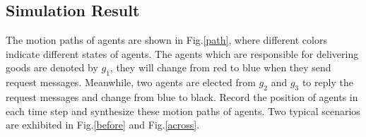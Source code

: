 \documentclass[journal]{IEEEtran}
\begin{document}
\subsection{Simulation Result}
The motion paths of agents are shown in Fig.\ref{path}, where different colors indicate different states of agents. The agents which are responsible for delivering  goods are denoted by $g_1$, they will change from red to blue when they send request messages. Meanwhile, two agents are elected from $g_2$ and $g_3$ to reply the request messages and change from blue to black. Record the position of agents in each time step and synthesize these motion paths of agents. Two typical scenarios are exhibited in Fig.\ref{before} and Fig.\ref{across}.\par
\end{document}
